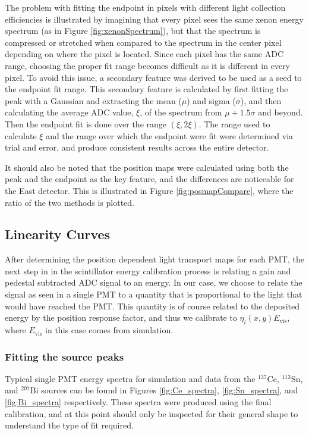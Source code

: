 The problem with fitting the endpoint in pixels with different light collection efficiencies is illustrated by
imagining that every pixel sees the same xenon energy spectrum (as in Figure \ref{fig:xenonSpectrum}), but that
the spectrum is compressed or stretched when compared to the spectrum in the center pixel depending on where
the pixel is located. Since each pixel has the same ADC range, choosing the proper fit range becomes difficult
as it is different in every pixel. To avoid this issue, a secondary feature was derived to be used as a
seed to the endpoint fit range. This secondary feature is calculated by first fitting the peak with a Gaussian
and extracting the mean ($\mu$) and sigma ($\sigma$), and then calculating the average ADC value, $\xi$, of the spectrum
from $\mu+1.5\sigma$ and beyond. Then the endpoint fit is done over the range $(\xi,2\xi)$. The range used to
calculate $\xi$ and the range over which the endpoint were fit were determined via trial and error, and produce
consistent results across the entire detector.

It should also be noted that the position maps were calculated using both the peak and the endpoint as the key
feature, and the differences are noticeable for the East detector. This is illustrated in Figure \ref{fig:posmapCompare}, where the
ratio of the two methods is plotted.



\subsection{Linearity Curves} \label{ssec:linCurves}
After determining the position dependent light transport maps for each PMT,
the next step in in the scintillator energy calibration process is relating a gain and pedestal subtracted ADC signal
to an energy. In our case, we choose to relate the signal as seen in a single PMT to a quantity that is
proportional to the light that would have reached the PMT. This quantity is of course related to the deposited
energy by the position response factor, and thus we calibrate to $\eta_i(x,y)E_{\mathrm{vis}}$, where $E_{\mathrm{vis}}$ in this
case comes from simulation.

\subsubsection{Fitting the source peaks}
Typical single PMT energy spectra for simulation and data from the $^{137}\mathrm{Ce}$, $^{113}\mathrm{Sn}$, and $^{207}\mathrm{Bi}$ sources can be
found in Figures \ref{fig:Ce_spectra}, \ref{fig:Sn_spectra}, and \ref{fig:Bi_spectra} respectively. These spectra were produced using the final
calibration, and at this point should only be inspected for their general shape to understand the type of fit required.


